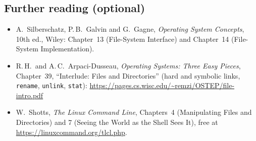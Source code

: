 \documentclass[11pt,a4paper]{article}
\newcommand{\cmd}[1]{\texttt{#1}}
\begin{document}
\subsection*{Further reading (optional)}
\begin{itemize}
  \item A.\ Silberschatz, P.\,B.\ Galvin and G.\ Gagne, \emph{Operating System Concepts}, 10th ed., Wiley: Chapter~13 (File-System Interface) and Chapter~14 (File-System Implementation).
  \item R.\,H.\ and A.\,C.\ Arpaci-Dusseau, \emph{Operating Systems: Three Easy Pieces}, Chapter~39, ``Interlude: Files and Directories'' (hard and symbolic links, \cmd{rename}, \cmd{unlink}, \cmd{stat}): \url{https://pages.cs.wisc.edu/~remzi/OSTEP/file-intro.pdf}
  \item W.\ Shotts, \emph{The Linux Command Line}, Chapters~4 (Manipulating Files and Directories) and 7 (Seeing the World as the Shell Sees It), free at \url{https://linuxcommand.org/tlcl.php}.
\end{itemize}
\end{document}
